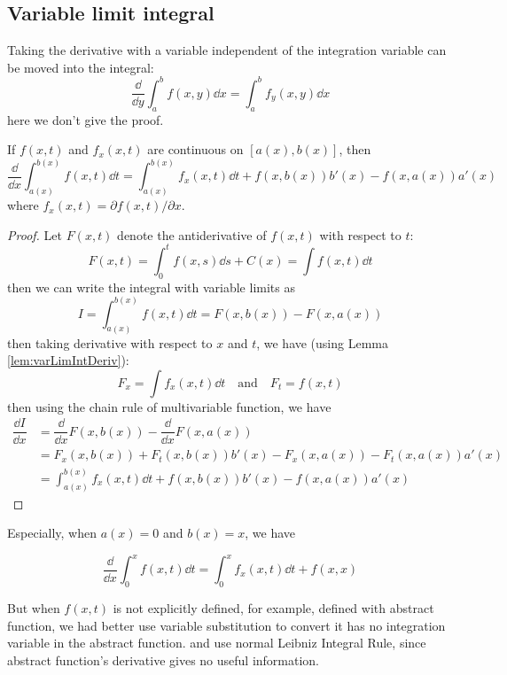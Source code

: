 \documentclass{overview}
\begin{document}
\subsection{Variable limit integral}

\begin{lemma}\label{lem:varLimIntDeriv}
Taking the derivative with a variable independent of the integration variable can be moved into the integral:
\[
	\dfrac{\dd}{\dd y} \int_a^b f(x, y) \dd x = \int_a^b f_y(x, y) \dd x
\] 
here we don't give the proof.
\end{lemma}
\begin{theorem}
If $f(x, t)$ and $f_x(x, t)$
are continuous on $[a(x), b(x)]$, then
\[
	\frac{\dd}{\dd x} \int_{a(x)}^{b(x)} f(x, t) \dd t
	= \int_{a(x)}^{b(x)} f_x(x, t) \dd t
	+ f(x, b(x)) b'(x) - f(x, a(x)) a'(x)
\]
where $f_x(x, t) = \partial f(x, t)/\partial x$.
\begin{proof}
	Let $F(x, t)$ denote the antiderivative of $f(x, t)$ with respect to $t$:
	\[
		F(x, t) = \int_{0}^{t} f(x, s) \dd s + C(x) = \int f(x, t) \dd t
	\] 
	then we can write the integral with variable limits as
	\[
		I = \int_{a(x)}^{b(x)} f(x, t) \dd t = F(x, b(x)) - F(x, a(x))
	\]
	then taking derivative with respect to $x$ and $t$, we have (using Lemma \ref{lem:varLimIntDeriv}):
	\[
		F_x = \int f_x(x, t) \dd t \quad \text{and} \quad F_t = f(x, t)
	\] 
	then using the chain rule of multivariable function, we have
	\[
		\begin{aligned}
			\dfrac{\dd I}{\dd x} &= \dfrac{\dd}{\dd x} F(x, b(x)) - \dfrac{\dd}{\dd x} F(x, a(x)) \\
			&= F_x(x, b(x)) + F_t(x, b(x)) b'(x)
			- F_x(x, a(x)) - F_t(x, a(x)) a'(x) \\
			&= \int_{a(x)}^{b(x)} f_x(x, t) \dd t
			+ f(x, b(x)) b'(x) - f(x, a(x)) a'(x)
		\end{aligned}
	\]
\end{proof}
\end{theorem}
Especially, when $a(x)=0$ and $b(x)=x$, we have
\begin{theorem}
	\[
		\frac{\dd}{\dd x} \int_{0}^{x} f(x, t) \dd t
		= \int_{0}^{x} f_x(x, t) \dd t
		+ f(x, x)
	\]
\end{theorem}

But when $f(x, t)$ is not explicitly defined, for example, defined with abstract function,
we had better use variable substitution to convert it has no integration variable in the abstract function.
and use normal Leibniz Integral Rule, since abstract function's derivative gives no useful information.
\end{document}
